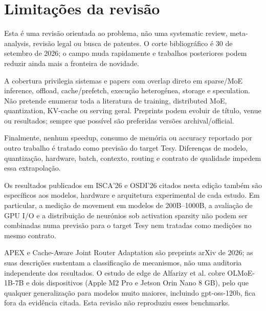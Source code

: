 \section{Limitações da revisão}
Esta é uma revisão orientada ao problema, não uma systematic review, meta-analysis, revisão legal ou busca de patentes. O corte bibliográfico é 30 de setembro de 2026; o campo muda rapidamente e trabalhos posteriores podem reduzir ainda mais a fronteira de novidade.

A cobertura privilegia sistemas e papers com overlap direto em sparse/MoE inference, offload, cache/prefetch, execução heterogénea, storage e speculation. Não pretende enumerar toda a literatura de training, distributed MoE, quantization, KV-cache ou serving geral. Preprints podem evoluir de título, venue ou resultados; sempre que possível são preferidas versões archival/official.

Finalmente, nenhum speedup, consumo de memória ou accuracy reportado por outro trabalho é tratado como previsão do target Tesy. Diferenças de modelo, quantização, hardware, batch, contexto, routing e contrato de qualidade impedem essa extrapolação.

Os resultados publicados em ISCA'26 e OSDI'26 citados nesta edição também são específicos aos modelos, hardware e arquitetura experimental de cada estudo. Em particular, a medição de movement em modelos de 200B--1000B, a avaliação de GPU I/O e a distribuição de neurónios sob activation sparsity não podem ser combinadas numa previsão para o target Tesy nem tratadas como medições no mesmo contrato.

APEX e Cache-Aware Joint Router Adaptation são preprints arXiv de 2026; as suas descrições sustentam a classificação de mecanismos, não uma auditoria independente dos resultados. O estudo de edge de Alfarizy et al. cobre OLMoE-1B-7B e dois dispositivos (Apple M2 Pro e Jetson Orin Nano 8 GB), pelo que qualquer generalização para modelos muito maiores, incluindo gpt-oss-120b, fica fora da evidência citada. Esta revisão não reproduziu esses benchmarks.

